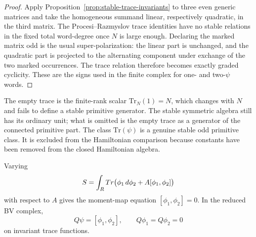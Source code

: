 \documentclass[11pt]{memoir}
\begin{document}
\begin{proof}
  Apply Proposition~\ref{prop:stable-trace-invariants} to three even generic
  matrices and take the homogeneous summand linear, respectively quadratic, in
  the third matrix. The Procesi--Razmyslov trace identities have no stable
  relations in the fixed total word-degree once $N$ is large enough. Declaring
  the marked matrix odd is the usual super-polarization: the linear part is
  unchanged, and the quadratic part is projected to the alternating component
  under exchange of the two marked occurrences. The trace relation therefore
  becomes exactly graded cyclicity. These are the signs used in the finite
  complex for one- and two-$\psi$ words.
\end{proof}

\begin{rmk}
  The empty trace is the finite-rank scalar $\mathrm{Tr}_N(1)=N$, which changes
  with $N$ and fails to define a stable primitive generator. The stable
  symmetric algebra still has its ordinary unit; what is omitted is the empty
  trace as a generator of the connected primitive part. The class
  $\mathrm{Tr}(\psi)$ is a genuine stable odd primitive class. It is excluded
  from the Hamiltonian comparison because constants have been removed from the
  closed Hamiltonian algebra.
\end{rmk}

Varying
$$S=\int_{R}Tr\bigl(\phi_1\,d\phi_2+A[\phi_1,\phi_2]\bigr)$$
with respect to $A$ gives the moment-map equation
$[\phi_1,\phi_2]=0$. In the reduced BV complex,
$$Q\psi=[\phi_1,\phi_2],\qquad Q\phi_1=Q\phi_2=0$$
on invariant trace functions.
\end{document}
